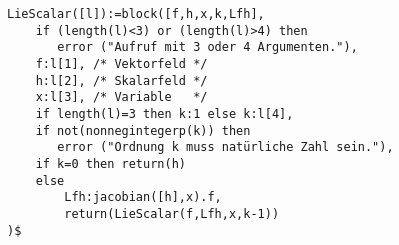 \noindent
\begin{minipage}[t]{\textwidth}
\color{blue}
\begin{verbatim}
LieScalar([l]):=block([f,h,x,k,Lfh],
    if (length(l)<3) or (length(l)>4) then 
       error ("Aufruf mit 3 oder 4 Argumenten."),
    f:l[1], /* Vektorfeld */
    h:l[2], /* Skalarfeld */
    x:l[3], /* Variable   */
    if length(l)=3 then k:1 else k:l[4],
    if not(nonnegintegerp(k)) then 
       error ("Ordnung k muss natürliche Zahl sein."),
    if k=0 then return(h)
    else 
        Lfh:jacobian([h],x).f,
        return(LieScalar(f,Lfh,x,k-1))
)$
\end{verbatim}
\end{minipage}

